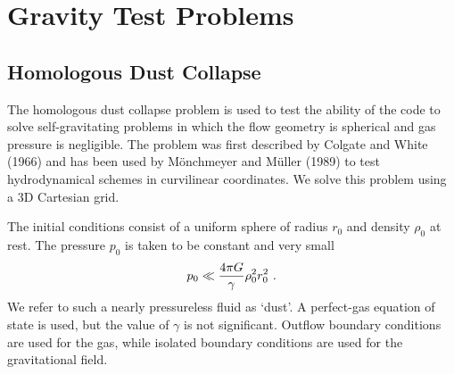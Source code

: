 % 



\section{Gravity Test Problems}


\subsection{Homologous Dust Collapse}
\label{Sec:SimulationDustCollapse}

The homologous dust collapse problem 
is used to test the ability
of the code to solve self-gravitating problems in which the flow
geometry is spherical and gas pressure is negligible. The problem was
first described by Colgate and White (1966) and has been used by
M\"onchmeyer and M\"uller (1989) to test hydrodynamical schemes in
curvilinear coordinates.  We solve this problem using a 3D Cartesian
grid.

The initial conditions consist of a uniform sphere of radius $r_0$ and
density $\rho_0$ at rest.  The pressure $p_0$ is taken to be constant and
very small
\begin{equation}
p_0 \ll {4\pi G\over\gamma}\rho_0^2 r_0^2\ .
\end{equation}
We refer to such a nearly pressureless fluid as `dust'. A perfect-gas
equation of state is used, but the value of $\gamma$ is not significant.
Outflow boundary conditions are used for the gas, while isolated boundary
conditions are used for the gravitational field.

